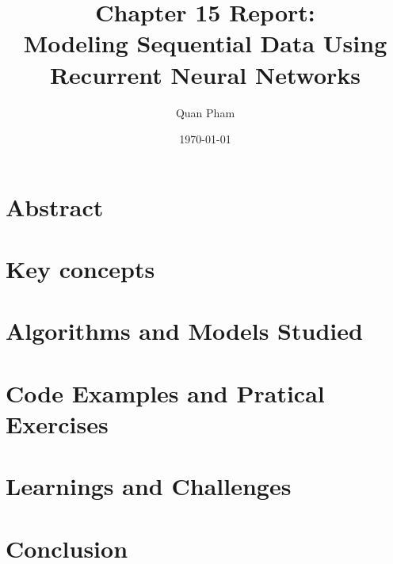 \documentclass[12pt]{article}
\title{Chapter 15 Report: \\ Modeling Sequential Data Using Recurrent Neural Networks}
\author{Quan Pham}
\date{\today}
\begin{document}
\maketitle
\tableofcontents
\newpage

\section{Abstract}


\section{Key concepts}


\section{Algorithms and Models Studied}


\section{Code Examples and Pratical Exercises}


\section{Learnings and Challenges}


\section{Conclusion}


% 
% 
\end{document}
